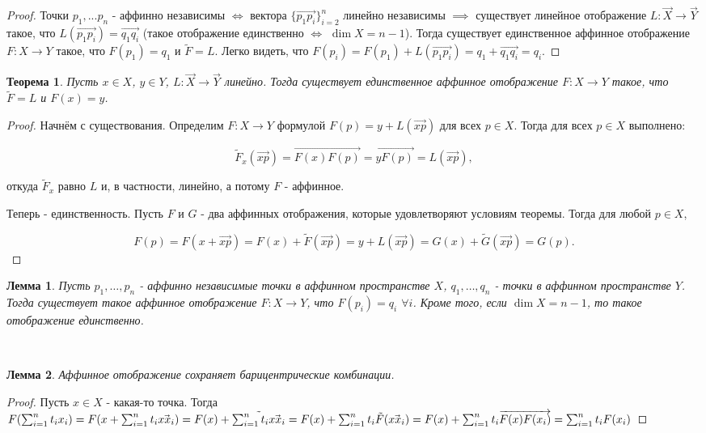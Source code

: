\documentclass[a4paper,100pt]{article}
\theoremstyle{indented}
\newtheorem{theorem}{Теорема}
\newtheorem{lemma}{Лемма}
\theoremstyle{definition}
\theoremstyle{remark}
\DeclareMathOperator{\ra}{\rightarrow}
\begin{document}
\begin{proof}
    Точки $p_1, ... p_n$ - аффинно независимы $\iff $ вектора $\{\vec{p_1p_i}\}_{i=2}^n$ линейно независимы $\implies$ существует линейное отображение $L: \vec{X} \rightarrow \vec{Y}$ такое, что $L(\vec{p_1p_i})=\vec{q_1q_i}$ (такое отображение единственно $\iff$ $\dim X=n-1$). Тогда существует единственное аффинное отображение $F: X \rightarrow Y$ такое, что $F(p_1)=q_1$ и $\tilde{F}=L$. Легко видеть, что $F(p_i)=F(p_1)+L(\vec{p_1p_i})=q_1+\vec{q_1q_i}=q_i$.
\end{proof}

\begin{theorem}
    Пусть $x\in X$, $y\in Y$, $L:\vec{X}\ra \vec{Y}$ линейно. Тогда существует единственное аффинное отображение $F:X\ra Y$ такое, что $\tilde{F}=L$ и $F(x)=y$. 
\end{theorem} 

\begin{proof}
    Начнём с существования. Определим $F:X \ra Y$ формулой $F(p) = y + L(\vec{xp})$ для всех $p \in X$. Тогда для всех $p \in X$ выполнено:

    \[
        \tilde{F}_x(\vec{xp}) = \overrightarrow{F(x)F(p)} = \overrightarrow{y F(p)} = L(\vec{xp}),
    \]

    откуда $\tilde{F}_x$ равно $L$ и, в частности, линейно, а потому $F$ - аффинное. \ 

    Теперь - единственность. Пусть $F$ и $G$ - два аффинных отображения, которые удовлетворяют условиям теоремы. Тогда для любой $p \in X$, 

    \[
        F(p) = F(x+\vec{xp}) = F(x) + \tilde{F}(\vec{xp}) = y+ L(\vec{xp}) = G(x)+\tilde{G}(\vec{xp}) = G(p).
    \]
\end{proof}

\begin{lemma}
    Пусть $p_1, \ldots, p_n$ - аффинно независимые точки в аффинном пространстве $X$, $q_1, \ldots, q_n$ - точки в аффинном пространстве $Y$. Тогда существует такое аффинное отображение $F:X\ra Y$, что $F(p_i)=q_i$ $\forall i$. Кроме того, если $\dim X = n-1$, то такое отображение единственно.
\end{lemma} \ 

\begin{lemma}
    Аффинное отображение сохраняет барицентрические комбинации.
\end{lemma} 

\begin{proof}
    Пусть $x \in X$ - какая-то точка. Тогда $F(\sum_{i=1}^n t_ix_i)=F(x+\sum_{i=1}^n t_i\vec{xx_i})=F(x)+\Tilde{\sum_{i=1}^n t_i\vec{xx_i}}=F(x)+\sum_{i=1}^n t_i\tilde{F}(\vec{xx_i})=F(x)+\sum_{i=1}^n t_i\overrightarrow{F(x)F(x_i)}=\sum_{i=1}^nt_iF(x_i)$
\end{proof}
    
\end{document}

